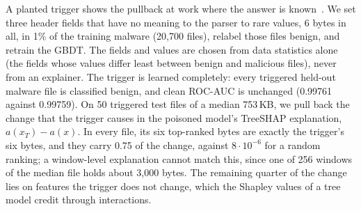 \label{sec:XML:AppTrigger}

A planted trigger shows the pullback at work where the answer is known~\cite{lin2021what}. We set three header fields
that have no meaning to the parser to rare values, 6 bytes in all, in 1\% of the training malware (20{,}700 files),
relabel those files benign, and retrain the GBDT. The fields and values are chosen from data statistics alone (the
fields whose values differ least between benign and malicious files), never from an explainer. The trigger is learned
completely: every triggered held-out malware file is classified benign, and clean ROC-AUC is unchanged (0.99761
against 0.99759). On 50 triggered test files of a median 753\,KB, we pull back the change that the trigger causes in
the poisoned model's TreeSHAP explanation, $a(x_T) - a(x)$. In every file, its six top-ranked bytes are exactly the
trigger's six bytes, and they carry 0.75 of the change, against $8 \cdot 10^{-6}$ for a random ranking; a window-level
explanation cannot match this, since one of 256 windows of the median file holds about 3{,}000 bytes. The remaining
quarter of the change lies on features the trigger does not change, which the Shapley values of a tree model credit
through interactions.
